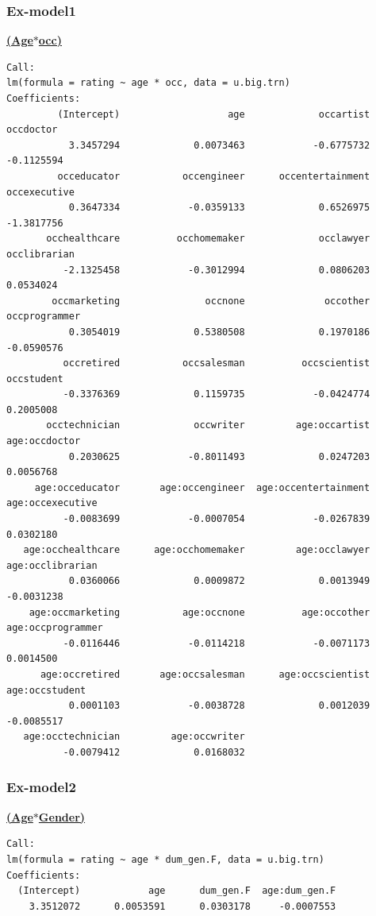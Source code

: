 \documentclass[11pt]{article}
\begin{document}
\subsubsection{Ex-model1}
\textbf{\underline{(Age$*$occ)}}
\begin{verbatim}
Call:
lm(formula = rating ~ age * occ, data = u.big.trn)
Coefficients:
         (Intercept)                   age             occartist             occdoctor  
           3.3457294             0.0073463            -0.6775732            -0.1125594  
         occeducator           occengineer      occentertainment          occexecutive  
           0.3647334            -0.0359133             0.6526975            -1.3817756  
       occhealthcare          occhomemaker             occlawyer          occlibrarian  
          -2.1325458            -0.3012994             0.0806203             0.0534024  
        occmarketing               occnone              occother         occprogrammer  
           0.3054019             0.5380508             0.1970186            -0.0590576  
          occretired           occsalesman          occscientist            occstudent  
          -0.3376369             0.1159735            -0.0424774             0.2005008  
       occtechnician             occwriter         age:occartist         age:occdoctor  
           0.2030625            -0.8011493             0.0247203             0.0056768  
     age:occeducator       age:occengineer  age:occentertainment      age:occexecutive  
          -0.0083699            -0.0007054            -0.0267839             0.0302180  
   age:occhealthcare      age:occhomemaker         age:occlawyer      age:occlibrarian  
           0.0360066             0.0009872             0.0013949            -0.0031238  
    age:occmarketing           age:occnone          age:occother     age:occprogrammer  
          -0.0116446            -0.0114218            -0.0071173             0.0014500  
      age:occretired       age:occsalesman      age:occscientist        age:occstudent  
           0.0001103            -0.0038728             0.0012039            -0.0085517  
   age:occtechnician         age:occwriter  
          -0.0079412             0.0168032  
\end{verbatim}

\subsubsection{Ex-model2}
\textbf{\underline{(Age$*$Gender)}}
\begin{verbatim}
Call:
lm(formula = rating ~ age * dum_gen.F, data = u.big.trn)
Coefficients:
  (Intercept)            age      dum_gen.F  age:dum_gen.F  
    3.3512072      0.0053591      0.0303178     -0.0007553 
\end{verbatim}
\end{document}
